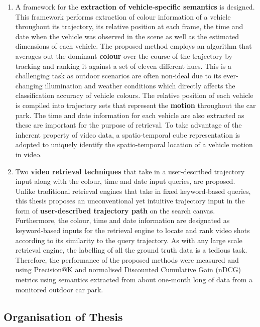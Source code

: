 \begin{enumerate}
\item A framework for the \textbf{extraction of vehicle-specific semantics} is designed. This framework performs extraction of colour information of a vehicle throughout its trajectory, its relative position %
at each frame, the time and date when the vehicle was observed in the scene %
as well as the estimated dimensions of each vehicle. The proposed method employs an algorithm that averages out the dominant \textbf{colour} over the course of the trajectory by tracking and ranking it against a set of eleven different hues. This is a challenging task as outdoor scenarios are often non-ideal due to its ever-changing illumination and weather conditions which directly affects the classification accuracy of vehicle colours. The relative position of each vehicle is compiled into trajectory sets that represent the \textbf{motion} throughout the car park. The time and date information for each vehicle are also extracted as these %
are important for the purpose of retrieval. To take advantage of the inherent property of video data, a spatio-temporal cube representation is adopted to uniquely identify the spatio-temporal location of a vehicle motion in video.
\item Two \textbf{video retrieval techniques} that take in a user-described trajectory input along with the colour, time and date input queries, are proposed. Unlike traditional retrieval engines that take in %
fixed
keyword-based queries, this thesis proposes an unconventional yet intuitive trajectory input in the form of \textbf{user-described trajectory path} on the search canvas. Furthermore, the colour, time and date information are designated as keyword-based inputs for the retrieval engine to locate and rank video shots according to its similarity to the query trajectory. As with any large scale retrieval engine, the labelling of all the ground truth data is a tedious task. %
Therefore, the performance of the proposed methods were measured and using Precision@K and normalised Discounted Cumulative Gain (nDCG) metrics using semantics extracted from about one-month long of data from a monitored outdoor car park.  
\end{enumerate}

\vspace{1em}
\subsection{Organisation of Thesis}

